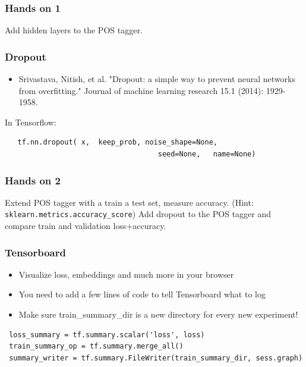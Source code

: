 \documentclass{beamer}
\begin{document}
\begin{frame}
  \frametitle{Hands on 1}

  Add hidden layers to the POS tagger.
  
\end{frame}

\begin{frame}[fragile]
  \frametitle{Dropout}

\begin{itemize}
\item   Srivastava, Nitish, et al. "Dropout: a simple way to prevent neural networks from overfitting." Journal of machine learning research 15.1 (2014): 1929-1958.
\end{itemize}
  
  In Tensorflow:
  \begin{verbatim}
   tf.nn.dropout( x,  keep_prob, noise_shape=None,  
   									seed=None,   name=None)
  \end{verbatim}
  
\end{frame}

\begin{frame}[fragile]
  \frametitle{Hands on 2}

  Extend POS tagger with a train a test set, measure accuracy. (Hint: \verb#sklearn.metrics.accuracy_score#)
  Add dropout to the POS tagger and compare train and validation loss+accuracy.
  
\end{frame}

\begin{frame}[fragile]
 
 \frametitle{Tensorboard}
  \begin{itemize}
		\item Visualize loss, embeddings and much more in your browser
		\item You need to add a few lines of code to tell Tensorboard what to log
		\item Make sure train\_summary\_dir is a new directory for every new experiment!
	\end{itemize}
			
	\begin{tiny}
\begin{lstlisting}
 loss_summary = tf.summary.scalar('loss', loss) 
 train_summary_op = tf.summary.merge_all()
 summary_writer = tf.summary.FileWriter(train_summary_dir, sess.graph)
\end{lstlisting}   
\end{tiny}    
	
\end{frame}
\end{document}
